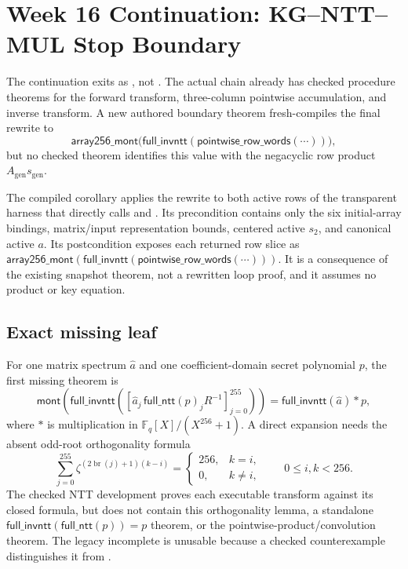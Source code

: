 \section{Week 16 Continuation: KG--NTT--MUL Stop Boundary}

The continuation exits as , not .  The
actual  chain already has checked procedure theorems
for the forward transform, three-column pointwise accumulation, and inverse
transform.  A new authored boundary theorem fresh-compiles the final rewrite
to
\[
 \mathsf{array256\_mont}
 \bigl(\mathsf{full\_invntt}
       (\mathsf{pointwise\_row\_words}(\cdots))\bigr),
\]
but no checked theorem identifies this value with the negacyclic row product
\(A_{\mathrm{gen}}s_{\mathrm{gen}}\).

The compiled corollary
 applies the rewrite to
both active rows of the transparent harness that directly calls
 and . Its
precondition contains only the six initial-array bindings, matrix/input
representation bounds, centered active \(s_2\), and canonical active \(a\).
Its postcondition exposes each returned row slice as
\(\mathsf{array256\_mont}(\mathsf{full\_invntt}
(\mathsf{pointwise\_row\_words}(\cdots)))\). It is a consequence of the
existing snapshot theorem, not a rewritten loop proof, and it assumes no
product or key equation.

\subsection*{Exact missing leaf}

For one matrix spectrum \(\widehat a\) and one coefficient-domain secret
polynomial \(p\), the first missing theorem is
\[
 \mathsf{mont}\!\left(
  \mathsf{full\_invntt}\left(
   \left[\widehat a_j\,\mathsf{full\_ntt}(p)_j R^{-1}\right]_{j=0}^{255}
  \right)\right)
 = \mathsf{full\_invntt}(\widehat a)\mathbin{\ast}p,
\]
where \(\ast\) is multiplication in
\(\mathbb F_q[X]/(X^{256}+1)\).  A direct expansion needs the absent
odd-root orthogonality formula
\[
 \sum_{j=0}^{255}
 \zeta^{(2\operatorname{br}(j)+1)(k-i)}
 = \begin{cases}256,&k=i,\\0,&k\ne i,\end{cases}
 \qquad 0\leq i,k<256.
\]
The checked NTT development proves each executable transform against its
closed formula, but does not contain this orthogonality lemma, a standalone
\(\mathsf{full\_invntt}(\mathsf{full\_ntt}(p))=p\) theorem, or the
pointwise-product/convolution theorem.  The legacy incomplete
 is unusable because a checked counterexample distinguishes
it from .

